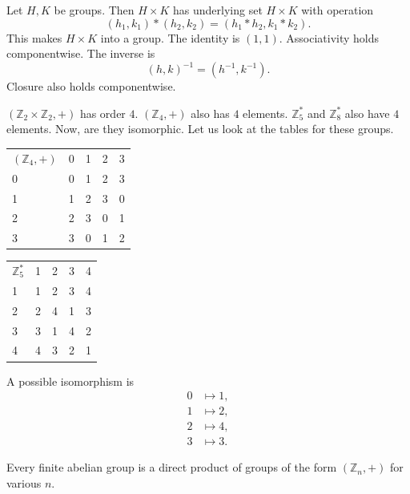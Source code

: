 \begin{example}
    Let $H,K$ be groups.
    Then $H\times K$ has underlying set $H\times K$ with operation
    \[
        (h_1,k_1)*(h_2,k_2)=(h_1*h_2,k_1*k_2).
    \]
    This makes $H\times K$ into a group.
    The identity is $(1,1)$.
    Associativity holds componentwise.
    The inverse is
    \[
        (h,k)^{-1}=(h^{-1},k^{-1}).
    \]
    Closure also holds componentwise.
\end{example}

$(\mathbb{Z}_2\times\mathbb{Z}_2,+)$ has order $4$.
$(\mathbb{Z}_4,+)$ also has $4$ elements.
$\mathbb{Z}_5^*$ and $\mathbb{Z}_8^*$ also have $4$ elements.
Now, are they isomorphic.
Let us look at the tables for these groups.

\begin{center}
    \begin{tabular}{lllll}
        $(\mathbb{Z}_4,+)$ & 0 & 1 & 2 & 3 \\
        0 & 0 & 1 & 2 & 3 \\
        1 & 1 & 2 & 3 & 0 \\
        2 & 2 & 3 & 0 & 1 \\
        3 & 3 & 0 & 1 & 2
    \end{tabular}

    \vspace{1em}

    \begin{tabular}{lllll}
        $\mathbb{Z}_5^*$ & 1 & 2 & 3 & 4 \\
        1 & 1 & 2 & 3 & 4 \\
        2 & 2 & 4 & 1 & 3 \\
        3 & 3 & 1 & 4 & 2 \\
        4 & 4 & 3 & 2 & 1
    \end{tabular}
\end{center}

A possible isomorphism is
\begin{align*}
    0 &\mapsto 1,\\
    1 &\mapsto 2,\\
    2 &\mapsto 4,\\
    3 &\mapsto 3.
\end{align*}

\begin{theorem*}{
    Every finite abelian group is a direct product of groups of the form $(\mathbb{Z}_n,+)$ for various $n$.
}
\end{theorem*}

